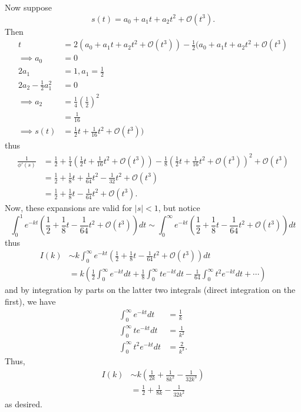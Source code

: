 \documentclass{article}
\begin{document}
\begin{itemize}
    Now suppose
    \[s(t) = a_0 + a_1t + a_2t^2 + \mathcal{O}(t^3).\]
    Then
    \begin{align*}
        t &= 2(a_0 + a_1t + a_2t^2 + \mathcal{O}(t^3)) - \frac{1}{2}(a_0 + a_1t + a_2t^2 + \mathcal{O}(t^3)\\
        \implies a_0 &= 0\\
        2a_1 &= 1, a_1 = \frac{1}{2}\\
        2a_2 - \frac{1}{2}a_1^2 &= 0\\
        \implies a_2 &= \frac{1}{4}\left(\frac{1}{2}\right)^2\\
        &= \frac{1}{16}\\
        \implies s(t) &= \frac{1}{2}t + \frac{1}{16}t^2 + \mathcal{O}(t^3))
    \end{align*}
    thus
    \begin{align*}
        \frac{1}{\phi'(s)} &= \frac{1}{2} + \frac{1}{4}\left(\frac{1}{2}t + \frac{1}{16}t^2 + \mathcal{O}(t^3)\right) - \frac{1}{8}\left(\frac{1}{2}t + \frac{1}{16}t^2 + \mathcal{O}(t^3)\right)^2 + \mathcal{O}(t^3)\\
        &= \frac{1}{2} + \frac{1}{8}t + \frac{1}{64}t^2 - \frac{1}{32}t^2 + \mathcal{O}(t^3)\\
        &= \frac{1}{2} + \frac{1}{8}t - \frac{1}{64}t^2 + \mathcal{O}(t^3).
    \end{align*}
    Now, these expansions are valid for $|s| < 1$, but notice
    \[\int_0^1e^{-kt}\left(\frac{1}{2} + \frac{1}{8}t - \frac{1}{64}t^2 + \mathcal{O}(t^3)\right)dt \sim \int_0^{\infty} e^{-kt}\left(\frac{1}{2} + \frac{1}{8}t - \frac{1}{64}t^2 + \mathcal{O}(t^3) \right)dt\]
    thus 
    \begin{align*}
        I(k) &\sim k\int_0^{\infty} e^{-kt} \left(\frac{1}{2} + \frac{1}{8}t - \frac{1}{64}t^2 + \mathcal{O}(t^3)\right)dt\\
        &= k\left(\frac{1}{2}\int_0^{\infty}e^{-kt}dt + \frac{1}{8}\int_0^{\infty}te^{-kt}dt - \frac{1}{64}\int_0^{\infty}t^2e^{-kt}dt + \cdots\right)
    \end{align*}
    and by integration by parts on the latter two integrals (direct integration on the first), we have
    \begin{align*}
        \int_0^{\infty}e^{-kt}dt &= \frac{1}{k}\\
        \int_0^{\infty}te^{-kt}dt &= \frac{1}{k^2}\\
        \int_0^{\infty}t^2e^{-kt}dt &= \frac{2}{k^3}.
    \end{align*}
    Thus,
    \begin{align*}
        I(k) &\sim k\left(\frac{1}{2k} + \frac{1}{8k^2} - \frac{1}{32k^3}\right)\\
        &= \frac{1}{2} + \frac{1}{8k} - \frac{1}{32k^2}
    \end{align*}
    as desired.



\end{itemize}
\end{document}
